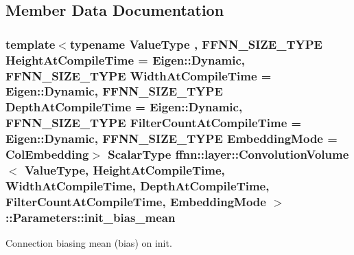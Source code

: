 \subsection{Member Data Documentation}
\hypertarget{structffnn_1_1layer_1_1_convolution_volume_1_1_parameters_ab4a409ee389af3da50ee46999d4d94c2}{
\subsubsection[{init\-\_\-bias\-\_\-mean}]{\setlength{\rightskip}{0pt plus 5cm}template$<$typename Value\-Type , F\-F\-N\-N\-\_\-\-S\-I\-Z\-E\-\_\-\-T\-Y\-P\-E Height\-At\-Compile\-Time = Eigen\-::\-Dynamic, F\-F\-N\-N\-\_\-\-S\-I\-Z\-E\-\_\-\-T\-Y\-P\-E Width\-At\-Compile\-Time = Eigen\-::\-Dynamic, F\-F\-N\-N\-\_\-\-S\-I\-Z\-E\-\_\-\-T\-Y\-P\-E Depth\-At\-Compile\-Time = Eigen\-::\-Dynamic, F\-F\-N\-N\-\_\-\-S\-I\-Z\-E\-\_\-\-T\-Y\-P\-E Filter\-Count\-At\-Compile\-Time = Eigen\-::\-Dynamic, F\-F\-N\-N\-\_\-\-S\-I\-Z\-E\-\_\-\-T\-Y\-P\-E Embedding\-Mode = Col\-Embedding$>$ {\bf Scalar\-Type} {\bf ffnn\-::layer\-::\-Convolution\-Volume}$<$ Value\-Type, Height\-At\-Compile\-Time, Width\-At\-Compile\-Time, Depth\-At\-Compile\-Time, Filter\-Count\-At\-Compile\-Time, {\bf Embedding\-Mode} $>$\-::Parameters\-::init\-\_\-bias\-\_\-mean}}\label{structffnn_1_1layer_1_1_convolution_volume_1_1_parameters_ab4a409ee389af3da50ee46999d4d94c2}


Connection biasing mean (bias) on init. 

